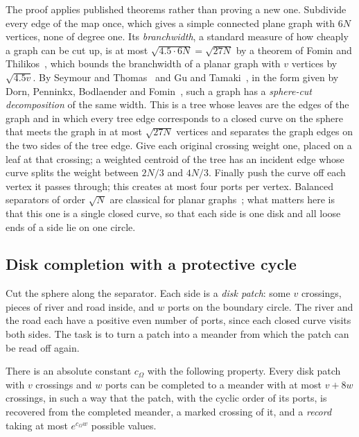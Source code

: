 The proof applies published theorems rather than proving a new one. Subdivide every edge
of the map once, which gives a simple connected plane graph with $6N$ vertices, none of degree one.
Its \emph{branchwidth}, a standard measure of how cheaply a graph can be cut up, is at most
$\sqrt{4.5\cdot 6N}=\sqrt{27N}$ by a theorem of Fomin and Thilikos~\cite{FominThilikos}, which bounds
the branchwidth of a planar graph with $v$ vertices by $\sqrt{4.5v}$. By Seymour and Thomas~\cite{ST}
and Gu and Tamaki~\cite{GuTamaki}, in the form given by Dorn, Penninkx, Bodlaender and
Fomin~\cite{DPBF}, such a graph has a \emph{sphere-cut decomposition} of the same width. This is a tree whose leaves are the edges of the graph and in which
every tree edge corresponds to a closed curve on the sphere that meets the graph in at most
$\sqrt{27N}$ vertices and separates the graph edges on the two sides of the tree edge. Give each
original crossing weight one, placed on a leaf at that crossing; a weighted centroid of the tree has
an incident edge whose curve splits the weight between $2N/3$ and $4N/3$. Finally push the curve off
each vertex it passes through; this creates at most four ports per vertex. Balanced separators of
order $\sqrt N$ are classical for planar graphs~\cite{LT,Miller}; what matters here is that this one
is a single closed curve, so that each side is one disk and all loose ends of a side lie on one
circle.

\subsection{Disk completion with a protective cycle}\label{sec:disc}

Cut the sphere along the separator. Each side is a \emph{disk patch}: some $v$ crossings, pieces of
river and road inside, and $w$ ports on the boundary circle. The river and the road each have a
positive even number of ports, since each closed curve visits both sides. The task is to turn a patch
into a meander from which the patch can be read off again.

\begin{proposition}\label{prop:disc}
There is an absolute constant $c_\Omega$ with the following property. Every disk patch with $v$ crossings
and $w$ ports can be completed to a meander with at most $v+8w$ crossings, in such a way that the patch,
with the cyclic order of its ports, is recovered from the completed meander, a marked crossing of it,
and a \emph{record} taking at most $e^{c_\Omega w}$ possible values.
\end{proposition}

